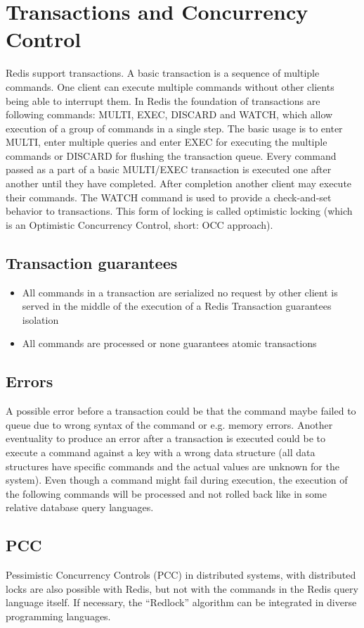 \chapter{Transactions and Concurrency Control}

Redis support transactions. A basic transaction is a sequence of multiple commands. One client can execute multiple commands without other clients being able to interrupt them. In Redis the foundation of transactions are following commands: MULTI, EXEC, DISCARD and WATCH, which allow execution of a group of commands in a single step. The basic usage is to enter MULTI, enter multiple queries and enter EXEC for executing the multiple commands or  DISCARD for flushing the transaction queue. Every command passed as a part of a basic MULTI/EXEC transaction is executed one after another until they have completed. After completion another client may execute their commands. The WATCH command is used to provide a check-and-set behavior to transactions. This form of locking is called optimistic locking (which is an Optimistic Concurrency Control, short: OCC approach).

\section{Transaction guarantees}
\begin{itemize}
	\item All commands in a transaction are serialized no request by other client is served in the middle of the execution of a Redis Transaction guarantees isolation
	\item All commands are processed or none guarantees atomic transactions
\end{itemize}

\section{Errors}
A possible error before a transaction could be that the command maybe failed to queue due to wrong syntax of the command or e.g. memory errors. Another eventuality to produce an error after a transaction is executed could be to execute a command against a key with a wrong data structure (all data structures have specific commands and the actual values are unknown for the system). Even though a command might fail during execution, the execution of the following commands will be processed and not rolled back like in some relative database query languages.

\section{PCC}
Pessimistic Concurrency Controls (PCC) in distributed systems, with distributed locks are also possible with Redis, but not with the commands in the Redis query language itself. If necessary, the “Redlock” algorithm can be integrated in diverse programming languages.
